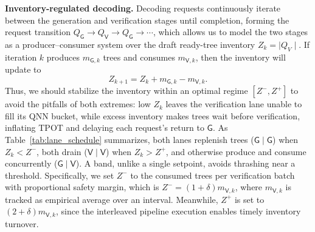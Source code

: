 \documentclass[sigconf,nonacm,10pt]{acmart}
\newcommand{\name}{NPUzzle\xspace}
\begin{document}
\noindent\textbf{Inventory-regulated decoding.} \label{sec:schedule_decode}
Decoding requests continuously iterate between the generation and verification stages until completion, forming the request transition $Q_\mathsf G\rightarrow Q_\mathsf V \rightarrow Q_\mathsf G\rightarrow\cdots$, which allows us to model the two stages as a producer--consumer system over the draft ready-tree inventory $Z_k=\mid \!Q_V\!\mid$.
If iteration $k$ produces $m_{\mathsf G,k}$ trees and consumes $m_{\mathsf V,k}$, then the inventory will update to
\begin{equation}
Z_{k+1}=Z_k+m_{\mathsf G,k}-m_{\mathsf V,k}.
\label{equ:inventory_dynamics}
\end{equation}
Thus, we should stabilize the inventory within an optimal regime $[Z^-, Z^+]$ to avoid the pitfalls of both extremes: low $Z_k$ leaves the verification lane unable to fill its QNN bucket, while excess inventory makes trees wait before verification, inflating TPOT and delaying each request's return to $\mathsf G$.
As Table~\ref{tab:lane_schedule} summarizes, both lanes replenish trees ($\mathsf G\mid\mathsf G$) when $Z_k<Z^-$, both drain ($\mathsf V\mid\mathsf V$) when $Z_k> Z^+$, and otherwise produce and consume concurrently ($\mathsf G\mid\mathsf V$). 
{\color{red}
A band,} unlike a single setpoint, avoids thrashing near a threshold. Specifically, we set $Z^-$ to the consumed trees per verification batch with proportional safety margin, which is $Z^-=(1+\delta)m_{\mathsf V,k}$, where $m_{\mathsf V,k}$ is tracked as empirical average over an interval. Meanwhile, $Z^+$ is set to $(2+\delta)m_{\mathsf V,k}$, since the interleaved pipeline execution enables timely inventory turnover. 
\end{document}
